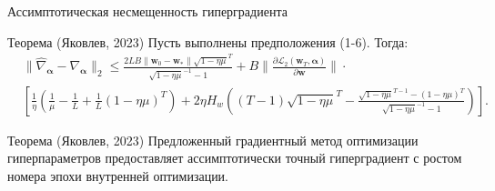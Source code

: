 \documentclass[aspectratio=169]{beamer}
\begin{document}
\begin{frame}{Ассимптотическая несмещенность гиперградиента}

  \begin{block}{Теорема (Яковлев, 2023)}
    Пусть выполнены предположения (1-6). Тогда:
    \begin{align*}
     &\|\hat{\nabla}_{\boldsymbol{\alpha}} - \nabla_{\boldsymbol{\alpha}}\|_2 \leq \frac{2LB\|\mathbf{w}_0 - \mathbf{w}_*\|\sqrt{1 - \eta\mu}^T}{\sqrt{1 - \eta\mu}^{-1} - 1} +
     B\|\frac{\partial\mathcal{L}_2(\mathbf{w}_T, \boldsymbol{\alpha})}{\partial\mathbf{w}}\| \cdot \\
     &\left[
      \frac{1}{\eta}(\frac{1}{\mu} - \frac{1}{L} + \frac{1}{L}(1 - \eta\mu)^T) + 2\eta H_w((T - 1)\sqrt{1 - \eta\mu}^T- 
      \frac{\sqrt{1 - \eta\mu}^{T-1} - (1 - \eta\mu)^T}{\sqrt{1 - \eta\mu}^{-1} - 1})
     \right].
    \end{align*}
  \end{block}

  \begin{block}{Теорема (Яковлев, 2023)}
    Предложенный градиентный метод оптимизации гиперпараметров предоставляет ассимптотически точный
    гиперградиент с ростом номера эпохи внутренней оптимизации.
  \end{block}
  
\end{frame}
\end{document}
